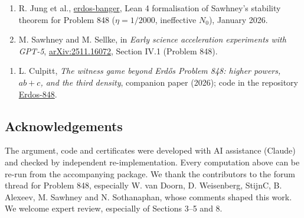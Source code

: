 \documentclass[
  11pt,
]{article}
\providecommand{\tightlist}{%
  \setlength{\itemsep}{0pt}\setlength{\parskip}{0pt}}
\begin{document}
\begin{enumerate}
\def\labelenumi{\arabic{enumi}.}
\setcounter{enumi}{11}
\tightlist
\item
  R. Jung et al.,
  \href{https://github.com/The-Obstacle-Is-The-Way/erdos-banger}{erdos-banger},
  Lean 4 formalisation of Sawhney's stability theorem for Problem 848
  (\(\eta = 1/2000\), ineffective \(N_0\)), January 2026.
\item
  M. Sawhney and M. Sellke, in \emph{Early science acceleration
  experiments with GPT-5},
  \href{https://arxiv.org/abs/2511.16072}{arXiv:2511.16072}, Section
  IV.1 (Problem 848).
\end{enumerate}

\begin{enumerate}
\def\labelenumi{\arabic{enumi})}
\setcounter{enumi}{13}
\tightlist
\item
  L. Culpitt, \emph{The witness game beyond Erdős Problem 848: higher
  powers, \(ab + c\), and the third density}, companion paper (2026);
  code in the repository
  \href{https://github.com/MeaCulpitt/Erdos-848}{Erdos-848}.
\end{enumerate}

\subsection{Acknowledgements}

The argument, code and certificates were developed with AI assistance
(Claude) and checked by independent re-implementation. Every computation
above can be re-run from the accompanying package. We thank the
contributors to the forum thread for Problem 848, especially W. van
Doorn, D. Weisenberg, StijnC, B. Alexeev, M. Sawhney and N. Sothanaphan,
whose comments shaped this work. We welcome expert review, especially of
Sections 3--5 and 8.
\end{document}
